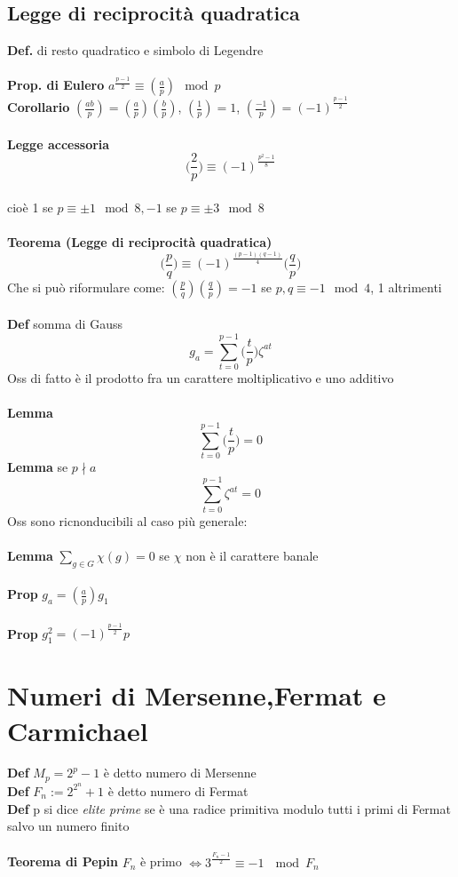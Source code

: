 \documentclass[10pt,a4paper]{article}
\begin{document}
\subsection{Legge di reciprocità quadratica}
\textbf{Def.} di resto quadratico e simbolo di Legendre\\\\
\textbf{Prop. di Eulero} $a^{\frac{p-1}{2}}\equiv (\frac{a}{p}) \mod p$\\
\textbf{Corollario} $(\frac{ab}{p}) = (\frac{a}{p})(\frac{b}{p})$,  
 $(\frac{1}{p}) = 1$,  $(\frac{-1}{p}) = (-1)^{\frac{p-1}{2}}$
\\\\
\textbf{Legge accessoria} $$\bigg (\frac{2}{p}\bigg) \equiv (-1)^{\frac{p^2-1}{8}}$$\\
cioè 1 se $p \equiv \pm 1 \mod 8, -1$ se  $p \equiv \pm3 \mod 8$\\\\
\textbf{Teorema (Legge di reciprocità quadratica)} $$\bigg ( \frac{p}{q} \bigg) \equiv (-1)^{\frac{(p-1)(q-1)}{4}} \bigg ( \frac{q}{p} \bigg)$$
Che si può riformulare come: $(\frac{p}{q}) (\frac{q}{p}) = -1$ se $p,q \equiv -1 \mod 4$, 1 altrimenti\\\\
\textbf{Def} somma di Gauss
$$ g_a= \sum_{t=0}^{p-1} \big ( \frac{t}{p} \big ) \zeta^{at}$$
Oss di fatto è il prodotto fra un carattere moltiplicativo e uno additivo\\\\
\textbf{Lemma}
$$ \sum_{t=0}^{p-1} \big ( \frac{t}{p} \big ) = 0$$
\textbf{Lemma} se $p \nmid a $
$$ \sum_{t=0}^{p-1} \zeta^{at} = 0$$
Oss sono ricnonducibili al caso più generale:\\\\
\textbf{Lemma} $\sum_{g\in G} \chi (g) = 0$ se $\chi$ non è il  carattere banale\\\\
\textbf{Prop}  $g_a = (\frac{a}{p} ) g_1$\\\\
\textbf{Prop} $g_1^2 = (-1)^{\frac{p-1}{2}}p$
\newpage
\section{Numeri di Mersenne,Fermat e Carmichael}
\textbf{Def} $M_p = 2^p-1$ è detto numero di Mersenne\\
\textbf{Def} $F_n := 2^{2^n}+1$ è detto numero di Fermat\\
\textbf{Def} p si dice \textit{elite prime} se è una radice primitiva modulo tutti i primi di Fermat salvo un numero finito\\\\
\textbf{Teorema di Pepin} $F_n$ è primo $\iff 3^{\frac{F_n -1}{2}}\equiv -1\ \mod F_n$
\end{document}
